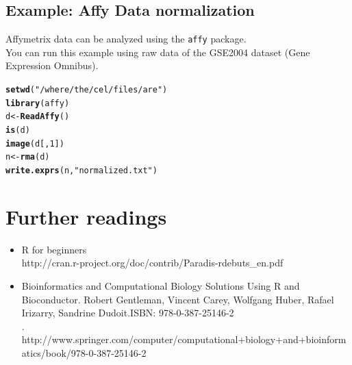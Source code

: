\documentclass[10pt]{article}\usepackage[]{graphicx}\usepackage[]{color}
\makeatletter
\newcommand{\hlnum}[1]{\textcolor[rgb]{0.686,0.059,0.569}{#1}}%
\newcommand{\hlstr}[1]{\textcolor[rgb]{0.192,0.494,0.8}{#1}}%
\newcommand{\hlstd}[1]{\textcolor[rgb]{0.345,0.345,0.345}{#1}}%
\newcommand{\hlkwb}[1]{\textcolor[rgb]{0.69,0.353,0.396}{#1}}%
\newcommand{\hlkwd}[1]{\textcolor[rgb]{0.737,0.353,0.396}{\textbf{#1}}}%
\newenvironment{kframe}{%
 \def\at@end@of@kframe{}%
 \ifinner\ifhmode%
  \def\at@end@of@kframe{\end{minipage}}%
  \begin{minipage}{\columnwidth}%
 \fi\fi%
 \def\FrameCommand##1{\hskip\@totalleftmargin \hskip-\fboxsep
 \colorbox{shadecolor}{##1}\hskip-\fboxsep
     \hskip-\linewidth \hskip-\@totalleftmargin \hskip\columnwidth}%
 \MakeFramed {\advance\hsize-\width
   \@totalleftmargin\z@ \linewidth\hsize
   \@setminipage}}%
 {\par\unskip\endMakeFramed%
 \at@end@of@kframe}
\newenvironment{knitrout}{}{} %
\newcommand{\Rfunction}[1]{{\texttt{#1}}}
\makeatother
\begin{document}
\subsection{Example: Affy Data normalization}

Affymetrix data can be analyzed using the \Rfunction{affy} package.\\
You can run this example using raw data of the GSE2004 dataset (Gene Expression Omnibus).\\

\begin{knitrout}
\color{fgcolor}\begin{kframe}
\begin{alltt}
\hlkwd{setwd}\hlstd{(}\hlstr{"/where/the/cel/files/are"}\hlstd{)}
\hlkwd{library}\hlstd{(affy)}
\hlstd{d} \hlkwb{<-} \hlkwd{ReadAffy}\hlstd{()}
\hlkwd{is}\hlstd{(d)}
\hlkwd{image}\hlstd{(d[,}\hlnum{1}\hlstd{])}
\hlstd{n} \hlkwb{<-} \hlkwd{rma}\hlstd{(d)}
\hlkwd{write.exprs}\hlstd{(n,}\hlstr{"normalized.txt"}\hlstd{)}
\end{alltt}
\end{kframe}
\end{knitrout}

\section{Further readings}
\begin{itemize}
 \item R for beginners\\
 http://cran.r-project.org/doc/contrib/Paradis-rdebuts\_en.pdf\\
 \item Bioinformatics and Computational Biology Solutions Using R and Bioconductor. Robert Gentleman, Vincent Carey, Wolfgang Huber, Rafael Irizarry, Sandrine Dudoit.ISBN: 978-0-387-25146-2\\.
 http://www.springer.com/computer/computational+biology+and+bioinformatics/book/978-0-387-25146-2

\end{itemize}
\end{document}
